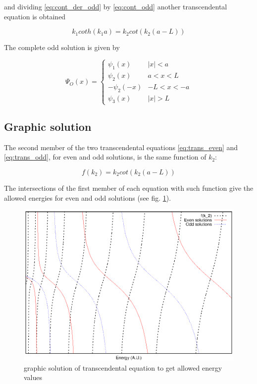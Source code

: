 \documentclass{article}
\begin{document}
and dividing \eqref{eq:cont_der_odd} by \eqref{eq:cont_odd} another transcendental equation is obtained

\begin{equation}
\label{eq:trans_odd}
k_{1} coth(k_{1}a) = k_{2} cot(k_{2}(a-L))
\end{equation}

The complete odd solution is given by

\begin{equation}
\Psi_{O}(x) = 
  \begin{cases} 
      \psi_{1}(x) & \left|x\right| < a \\
      \psi_{2}(x) & a < x < L \\
      -\psi_{2}(-x) & -L < x < -a \\
      \psi_{3}(x) & \left|x\right| > L
   \end{cases}
\end{equation}

\subsection{Graphic solution}
The second member of the two transcendental equations \eqref{eq:trans_even} and \eqref{eq:trans_odd}, for even and odd solutions, is the same function of \(k_{2}\):

\begin{equation}
f(k_{2}) = k_{2} cot(k_{2}(a-L))
\end{equation}

The intersections of the first member of each equation with such function give the allowed energies for even and odd solutions (see fig. \ref{graph_sol_ex_1_3}).

\begin{figure}
\centering
\includegraphics{graph_sol_ex_1_3.eps}
\caption{graphic solution of transcendental equation to get allowed energy values}
\label{graph_sol_ex_1_3}
\end{figure}
\end{document}
